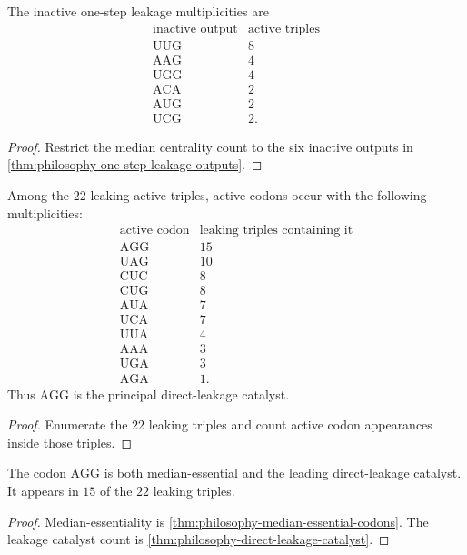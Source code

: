 \begin{theorem}
\label{thm:philosophy-direct-leakage-spectrum}
The inactive one-step leakage multiplicities are
$$
\begin{array}{c|r}
  \text{inactive output} & \text{active triples}\\
  \hline
  \mathrm{UUG} & 8\\
  \mathrm{AAG} & 4\\
  \mathrm{UGG} & 4\\
  \mathrm{ACA} & 2\\
  \mathrm{AUG} & 2\\
  \mathrm{UCG} & 2.
\end{array}
$$
\end{theorem}
\begin{proof}
Restrict the median centrality count to the six inactive outputs in
\autoref{thm:philosophy-one-step-leakage-outputs}.
\end{proof}

\begin{theorem}
\label{thm:philosophy-direct-leakage-catalyst}
Among the $22$ leaking active triples, active codons occur with the
following multiplicities:
$$
\begin{array}{c|r}
  \text{active codon} & \text{leaking triples containing it}\\
  \hline
  \mathrm{AGG} & 15\\
  \mathrm{UAG} & 10\\
  \mathrm{CUC} & 8\\
  \mathrm{CUG} & 8\\
  \mathrm{AUA} & 7\\
  \mathrm{UCA} & 7\\
  \mathrm{UUA} & 4\\
  \mathrm{AAA} & 3\\
  \mathrm{UGA} & 3\\
  \mathrm{AGA} & 1.
\end{array}
$$
Thus $\mathrm{AGG}$ is the principal direct-leakage catalyst.
\end{theorem}
\begin{proof}
Enumerate the $22$ leaking triples and count active codon appearances
inside those triples.
\end{proof}

\begin{corollary}
\label{cor:philosophy-agg-median-gate-role}
The codon $\mathrm{AGG}$ is both median-essential and the leading
direct-leakage catalyst. It appears in $15$ of the $22$ leaking triples.
\end{corollary}
\begin{proof}
Median-essentiality is
\autoref{thm:philosophy-median-essential-codons}. The leakage catalyst
count is \autoref{thm:philosophy-direct-leakage-catalyst}.
\end{proof}

